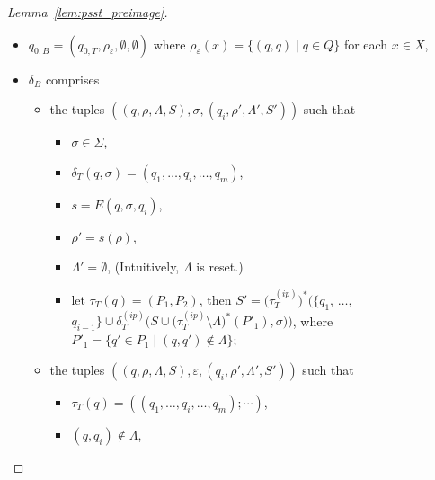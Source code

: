 \begin{proof}[Lemma~\ref{lem:psst_preimage}]
\begin{itemize}
\item $q_{0, B} = (q_{0,T}, \rho_{\varepsilon}, \emptyset, \emptyset)$ where $\rho_{\varepsilon} (x) = \{(q, q) \mid q \in Q\}$ for each $x \in X$,

\item $\delta_{B}$ comprises 
\begin{itemize}
%
\item the tuples $((q, \rho, \Lambda, S), \sigma, (q_i, \rho', \Lambda', S'))$ such that  
\begin{itemize}
\item $\sigma \in \Sigma$, 
%
\item $\delta_T (q, \sigma) = (q_1, \ldots, q_i, \ldots, q_m)$, 
%
\item $s = E(q, \sigma, q_i)$, 
%
\item $\rho' = s(\rho)$,
%
\item $\Lambda' = \emptyset$, (Intuitively, $\Lambda$ is reset.)
%
\item let $\tau_T(q) = (P_1, P_2)$, then $S' = \big(\tau^{(ip)}_T\big)^\ast\big(\{ q_1$, $\ldots$, $q_{i - 1} \} \cup \delta^{(ip)}_T\big(S \cup \big(\tau^{(ip)}_T \setminus \Lambda\big)^\ast(P'_1), \sigma\big)\big)$, where $P'_1 = \{q' \in P_1 \mid (q, q') \not \in \Lambda\}$;  
%
\end{itemize}
%
\item the tuples $((q, \rho, \Lambda, S), \varepsilon, (q_i, \rho', \Lambda', S'))$ such that 
\begin{itemize}
%
\item $\tau_T(q) = ((q_1, \ldots, q_i, \ldots, q_m); \cdots)$, 
%
\item $(q, q_i) \not \in \Lambda$,


\end{itemize}
\end{itemize}
\end{itemize}
\end{proof}
